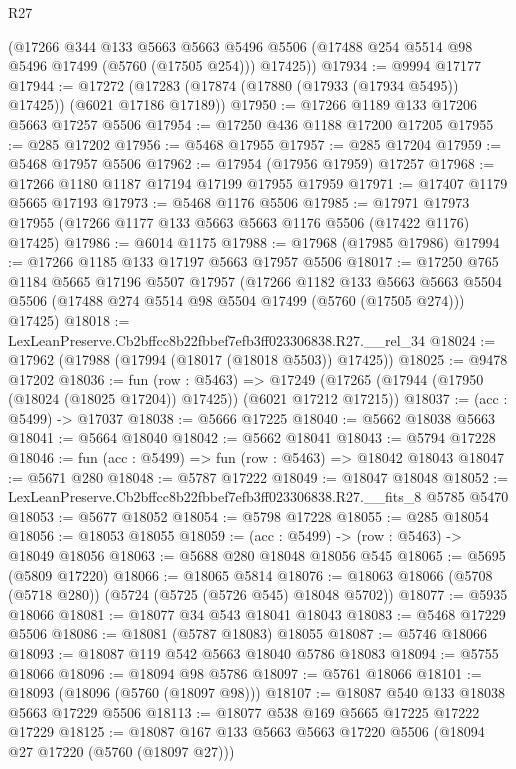 \begin{lexlean}{R27}
\begin{coremodule}
      (@17266
        @344
        @133
        @5663
        @5663
        @5496
        @5506
        (@17488 @254 @5514 @98 @5496 @17499 (@5760 (@17505 @254)))
        @17425))
@17934 := @9994 @17177
@17944 := @17272 (@17283 (@17874 (@17880 (@17933 (@17934 @5495)) @17425)) (@6021 @17186 @17189))
@17950 := @17266 @1189 @133 @17206 @5663 @17257 @5506
@17954 := @17250 @436 @1188 @17200 @17205
@17955 := @285 @17202
@17956 := @5468 @17955
@17957 := @285 @17204
@17959 := @5468 @17957 @5506
@17962 := @17954 (@17956 @17959) @17257
@17968 := @17266 @1180 @1187 @17194 @17199 @17955 @17959
@17971 := @17407 @1179 @5665 @17193
@17973 := @5468 @1176 @5506
@17985 := @17971 @17973 @17955 (@17266 @1177 @133 @5663 @5663 @1176 @5506 (@17422 @1176) @17425)
@17986 := @6014 @1175
@17988 := @17968 (@17985 @17986)
@17994 := @17266 @1185 @133 @17197 @5663 @17957 @5506
@18017 := @17250
    @765
    @1184
    @5665
    @17196
    @5507
    @17957
    (@17266
      @1182
      @133
      @5663
      @5663
      @5504
      @5506
      (@17488 @274 @5514 @98 @5504 @17499 (@5760 (@17505 @274)))
      @17425)
@18018 := LexLeanPreserve.Cb2bffcc8b22fbbef7efb3ff023306838.R27.__rel_34
@18024 := @17962 (@17988 (@17994 (@18017 (@18018 @5503)) @17425))
@18025 := @9478 @17202
@18036 := fun (row : @5463) =>
  @17249 (@17265 (@17944 (@17950 (@18024 (@18025 @17204)) @17425)) (@6021 @17212 @17215))
@18037 := (acc : @5499) -> @17037
@18038 := @5666 @17225
@18040 := @5662 @18038 @5663
@18041 := @5664 @18040
@18042 := @5662 @18041
@18043 := @5794 @17228
@18046 := fun (acc : @5499) => fun (row : @5463) => @18042 @18043
@18047 := @5671 @280
@18048 := @5787 @17222
@18049 := @18047 @18048
@18052 := LexLeanPreserve.Cb2bffcc8b22fbbef7efb3ff023306838.R27.__fits_8 @5785 @5470
@18053 := @5677 @18052
@18054 := @5798 @17228
@18055 := @285 @18054
@18056 := @18053 @18055
@18059 := (acc : @5499) -> (row : @5463) -> @18049 @18056
@18063 := @5688 @280 @18048 @18056 @545
@18065 := @5695 (@5809 @17220)
@18066 := @18065 @5814
@18076 := @18063 @18066 (@5708 (@5718 @280)) (@5724 (@5725 (@5726 @545) @18048 @5702))
@18077 := @5935 @18066
@18081 := @18077 @34 @543 @18041 @18043
@18083 := @5468 @17229 @5506
@18086 := @18081 (@5787 @18083) @18055
@18087 := @5746 @18066
@18093 := @18087 @119 @542 @5663 @18040 @5786 @18083
@18094 := @5755 @18066
@18096 := @18094 @98 @5786
@18097 := @5761 @18066
@18101 := @18093 (@18096 (@5760 (@18097 @98)))
@18107 := @18087 @540 @133 @18038 @5663 @17229 @5506
@18113 := @18077 @538 @169 @5665 @17225 @17222 @17229
@18125 := @18087 @167 @133 @5663 @5663 @17220 @5506 (@18094 @27 @17220 (@5760 (@18097 @27)))

\end{coremodule}
\end{lexlean}
